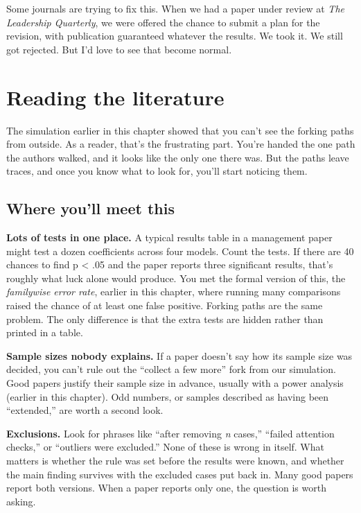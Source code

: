 \documentclass[
]{book}
\begin{document}
Some journals are trying to fix this. When we had a paper under review at \emph{The Leadership Quarterly}, we were offered the chance to submit a plan for the revision, with publication guaranteed whatever the results. We took it. We still got rejected. But I'd love to see that become normal.

\section{Reading the literature}\label{issues-reading}

The simulation earlier in this chapter showed that you can't see the forking paths from outside. As a reader, that's the frustrating part. You're handed the one path the authors walked, and it looks like the only one there was. But the paths leave traces, and once you know what to look for, you'll start noticing them.

\subsection{Where you'll meet this}\label{where-youll-meet-this-9}

\textbf{Lots of tests in one place.} A typical results table in a management paper might test a dozen coefficients across four models. Count the tests. If there are 40 chances to find p \textless{} .05 and the paper reports three significant results, that's roughly what luck alone would produce. You met the formal version of this, the \emph{familywise error rate}, earlier in this chapter, where running many comparisons raised the chance of at least one false positive. Forking paths are the same problem. The only difference is that the extra tests are hidden rather than printed in a table.

\textbf{Sample sizes nobody explains.} If a paper doesn't say how its sample size was decided, you can't rule out the ``collect a few more'' fork from our simulation. Good papers justify their sample size in advance, usually with a power analysis (earlier in this chapter). Odd numbers, or samples described as having been ``extended,'' are worth a second look.

\textbf{Exclusions.} Look for phrases like ``after removing \emph{n} cases,'' ``failed attention checks,'' or ``outliers were excluded.'' None of these is wrong in itself. What matters is whether the rule was set before the results were known, and whether the main finding survives with the excluded cases put back in. Many good papers report both versions. When a paper reports only one, the question is worth asking.
\end{document}
